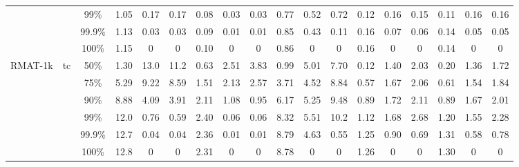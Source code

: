 \documentclass[sigconf,screen,review=false,natbib]{acmart}
\theoremstyle{definition}
\begin{document}
\begin{table*}
\begin{center}
\begin{tabular}{|c|c|c|c|c|c|c|c|c|c|c|c|c|c|c|c|c|c|}
			        &                         & 99\%   & 1.05                      & 0.17                                   & 0.17                       & 0.08                                    & 0.03                     & 0.03 & 0.77 & 0.52 & 0.72 & 0.12 & 0.16 & 0.15 & 0.11 & 0.16 & 0.16 \\
			        &                         & 99.9\% & 1.13                      & 0.03                                   & 0.03                       & 0.09                                    & 0.01                     & 0.01 & 0.85 & 0.43 & 0.11 & 0.16 & 0.07 & 0.06 & 0.14 & 0.05 & 0.05 \\
			        &                         & 100\%  & 1.15                      & 0                                      & 0                          & 0.10                                    & 0                        & 0    & 0.86 & 0    & 0    & 0.16 & 0    & 0    & 0.14 & 0    & 0    \\
			\hline
			RMAT-1k & \multirow{6}{*}{tc}     & 50\%   & 1.30                      & 13.0                                   & 11.2                       & 0.63                                    & 2.51                     & 3.83 & 0.99 & 5.01 & 7.70 & 0.12 & 1.40 & 2.03 & 0.20 & 1.36 & 1.72 \\
			        &                         & 75\%   & 5.29                      & 9.22                                   & 8.59                       & 1.51                                    & 2.13                     & 2.57 & 3.71 & 4.52 & 8.84 & 0.57 & 1.67 & 2.06 & 0.61 & 1.54 & 1.84 \\
			        &                         & 90\%   & 8.88                      & 4.09                                   & 3.91                       & 2.11                                    & 1.08                     & 0.95 & 6.17 & 5.25 & 9.48 & 0.89 & 1.72 & 2.11 & 0.89 & 1.67 & 2.01 \\
			        &                         & 99\%   & 12.0                      & 0.76                                   & 0.59                       & 2.40                                    & 0.06                     & 0.06 & 8.32 & 5.51 & 10.2 & 1.12 & 1.68 & 2.68 & 1.20 & 1.55 & 2.28 \\
			        &                         & 99.9\% & 12.7                      & 0.04                                   & 0.04                       & 2.36                                    & 0.01                     & 0.01 & 8.79 & 4.63 & 0.55 & 1.25 & 0.90 & 0.69 & 1.31 & 0.58 & 0.78 \\
			        &                         & 100\%  & 12.8                      & 0                                      & 0                          & 2.31                                    & 0                        & 0    & 8.78 & 0    & 0    & 1.26 & 0    & 0    & 1.30 & 0    & 0    \\
			\hline
		\end{tabular}
	\end{center}
	\label{tab:mainbenchmark}
\end{table*}
\end{document}
